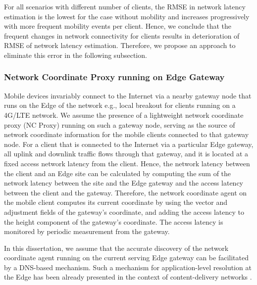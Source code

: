 For all scenarios with different number of clients, the RMSE in network latency estimation is the lowest for the case without mobility and increases progressively with more frequent mobility events per client. Hence, we conclude that the frequent changes in network connectivity for clients results in deterioration of RMSE of network latency estimation. Therefore, we propose an approach to eliminate this error in the following subsection.

\subsubsection{Network Coordinate Proxy running on Edge Gateway}
Mobile devices invariably connect to the Internet via a nearby gateway node that runs on the Edge of the network e.g., local breakout \cite{localbreakout} for clients running on a 4G/LTE network. We assume the presence of a lightweight network coordinate proxy (NC Proxy) running on such a gateway node, serving as the source of network coordinate information for the mobile clients connected to that gateway node. For a client that is connected to the Internet via a particular Edge gateway, all uplink and downlink traffic flows through that gateway, and it is located at a fixed access network latency from the client. Hence, the network latency between the client and an Edge site can be calculated by computing the sum of the network latency between the site and the Edge gateway and the access latency between the client and the gateway. Therefore, the network coordinate agent on the mobile client computes its current coordinate by using the vector and adjustment fields of the gateway's coordinate, and adding the access latency to the height component of the gateway's coordinate. The access latency is monitored by periodic measurement from the gateway.
\par In this dissertation, we assume that the accurate discovery of the network coordinate agent running on the current serving Edge gateway can be facilitated by a DNS-based mechanism. Such a mechanism for application-level resolution at the Edge has been already presented in the context of content-delivery networks \cite{hsu2020dns}. 

